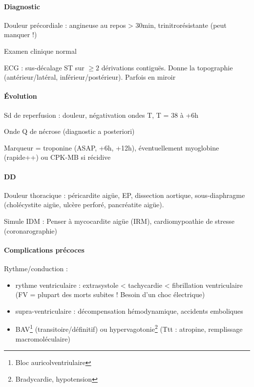 \paragraph{Diagnostic}
Douleur précordiale : angineuse au repos > 30min, trinitrorésistante (peut
manquer !)

Examen clinique normal

ECG : sus-décalage ST sur $\ge 2$ dérivations contiguës. Donne la topographie
(antérieur/latéral, inférieur/postérieur).
Parfois en miroir


\paragraph{Évolution}
Sd de reperfusion : \dec douleur, négativation ondes T, T = 38
à +6h

Onde Q de nécrose (diagnostic a posteriori)

Marqueur = troponine (ASAP, +6h, +12h), éventuellement myoglobine (rapide++) ou
CPK-MB si récidive

\paragraph{DD} 
Douleur thoracique : péricardite aigüe, EP, dissection aortique, sous-diaphragme (cholécystite aigüe,
ulcère perforé, pancréatite aigüe).

Simule IDM : Penser à mycocardite aigüe (IRM), cardiomypoathie de stresse
(coronarographie)

\paragraph{Complications précoces}
Rythme/conduction : 
\begin{itemize}
  \item rythme ventriculaire : extrasystole < tachycardie < fibrillation
    ventriculaire (FV = plupart des morts subites ! Besoin d'un choc électrique)
  \item supra-ventriculaire : décompensation hémodynamique, accidents emboliques
  \item BAV\footnote{Bloc auricolventriulaire} (transitoire/définitif) ou
    hypervagotonie\footnote{Bradycardie, hypotension} (Ttt : atropine, remplissage
    macromoléculaire)
\end{itemize}

